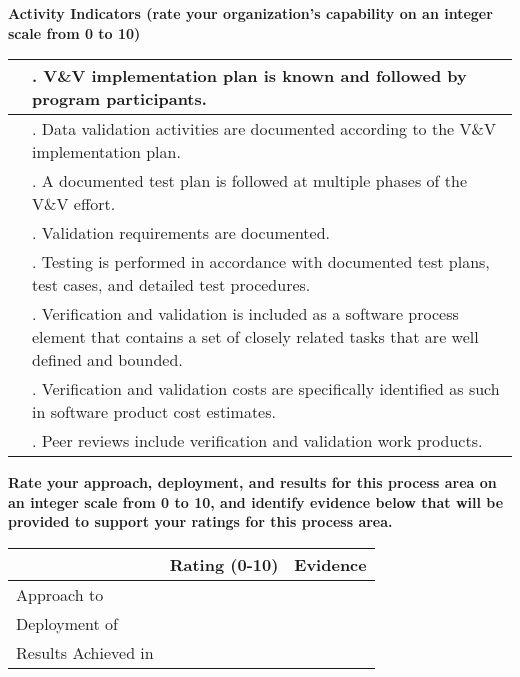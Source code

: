 \documentclass{article}
\newcommand{\KPAname}{}
\newcounter{activity}		%
\newenvironment{KPAActivity}
{
    \setcounter{activity}{0} %
    {\bf Activity Indicators (rate your organization's capability
    on an integer scale from 0 to 10)} %
    \begin{center}
    \begin{tabular}{|p{0.5in}|p{6.0in}|} \hline %
}
{
    \end{tabular}
    \end{center}
}
\newcommand{\Activity}[2]
{
    \stepcounter{activity} #1 & \arabic{activity}. #2 \\ \hline
} %
\newenvironment{KPARate}
{
    {\bf Rate your approach, deployment, and results for
    this process area on an integer scale from 0 to 10, and 
    identify evidence below that will be provided to support your
    ratings for this process area.}
    \begin{center}
    \begin{tabular}{|p{1.0in}|p{0.5in}|p{5.0in}|} \hline
    & Rating (0-10) & \multicolumn{1}{c|}{Evidence} \\ \hline
}
{
    \end{tabular}
    \end{center}
}
\newcommand{\Approach}[2]{Approach to \KPAname & #1 & #2 \\ \hline}
\newcommand{\Deployment}[2]{Deployment of \KPAname & #1 & #2 \\ \hline}
\newcommand{\Results}[2]{Results Achieved in \KPAname & #1 & #2 \\
	\hline}
\begin{document}
\begin{KPAActivity}
\Activity{}{V\&V implementation plan is known and followed by program
participants.}
\Activity{}{Data validation activities are documented according to the
V\&V implementation plan.}
\Activity{}{A documented test plan is followed at multiple phases of the
V\&V effort.}
\Activity{}{Validation requirements are documented.}
\Activity{}{Testing is performed in accordance with documented test
plans, test cases, and detailed test procedures.}
\Activity{}{Verification and validation is included as a software
process element that contains a set of closely related tasks that are
well defined and bounded.}
\Activity{}{Verification and validation costs are specifically
identified as such in software product cost estimates.}
\Activity{}{Peer reviews include verification and validation work
products.}
\end{KPAActivity}

\begin{KPARate}
\Approach{}{}
\Deployment{}{}
\Results{}{}
\end{KPARate}
\end{document}
